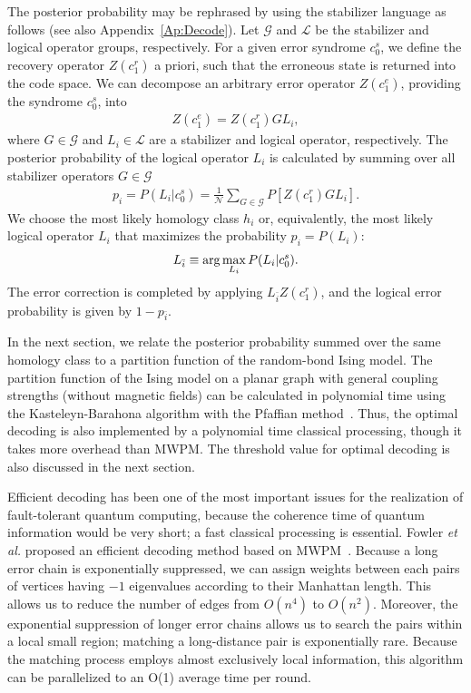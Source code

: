 The posterior probability may be rephrased by using the stabilizer language as follows (see also Appendix~\ref{Ap:Decode}).
Let $\mathcal{G}$ and $\mathcal{L}$ be the stabilizer and logical operator groups, respectively.
For a given error syndrome $c_0^{s}$, we define the recovery operator $Z(c_1^{r})$ a priori, such that the erroneous state is returned into the code space. 
We can decompose an arbitrary error operator $Z(c_1^e)$, providing the syndrome $c_0^{s}$, into 
\begin{eqnarray}
Z(c_1^e) = Z(c_1^{r}) G L_i,
\label{eq:decomposition}
\end{eqnarray}
where $G \in \mathcal{G}$ and $L_i \in \mathcal{L}$ are a stabilizer and logical operator, respectively.
The posterior probability of the logical operator $L_i$ is calculated by summing over all stabilizer operators $G \in \mathcal{G}$
\begin{eqnarray}
p_i = P (L_i| c_0^{s}) = \frac{1}{\mathcal{N}} \sum _{G \in \mathcal{G}} P[Z(c_1^{r}) G L_i ]. 
\end{eqnarray}
We choose the most likely homology class $h_i$ or, equivalently, the most likely logical operator $L_i$ that maximizes the probability $p_i =  P(L_i)$:
\begin{eqnarray}
L_{\bar i} \equiv {\rm arg}\max _{L_i}  P (L_i| c_0^{s}).
\end{eqnarray}
The error correction is completed by applying 
$L_{\bar i} Z(c^{r}_1)$, and the logical error probability 
is given by $1-p_{\bar i}$.

In the next section, we relate the posterior probability summed over the same homology class to a partition function of the random-bond Ising model.
The partition function of the Ising model on a planar graph with general coupling strengths (without magnetic fields) can be calculated in polynomial time using the Kasteleyn-Barahona algorithm with the Pfaffian method~\cite{Kasteleyn,Barahona,BravyiRaussendorf}.
Thus, the optimal decoding is also implemented by a polynomial time classical processing, though it takes more overhead than MWPM.
The threshold value for optimal decoding is also discussed in the next section.

Efficient decoding has been one of the most important issues for the realization of fault-tolerant quantum computing, because the coherence time of quantum information would be very short; a fast classical processing is essential.
Fowler {\it et al.} proposed an efficient decoding method based on MWPM~\cite{FowlerDecode}. 
Because a long error chain is exponentially suppressed, we can assign weights between each pairs of vertices having $-1$ eigenvalues according to their Manhattan length.
This allows us to reduce the number of edges from $O(n^4)$ to $O(n^2)$.
Moreover, the exponential suppression of longer error chains allows us to search the pairs within a local small region; matching a long-distance pair is exponentially rare.
Because the matching process employs almost exclusively local information, this algorithm can be parallelized to an O(1) average time per round. 

